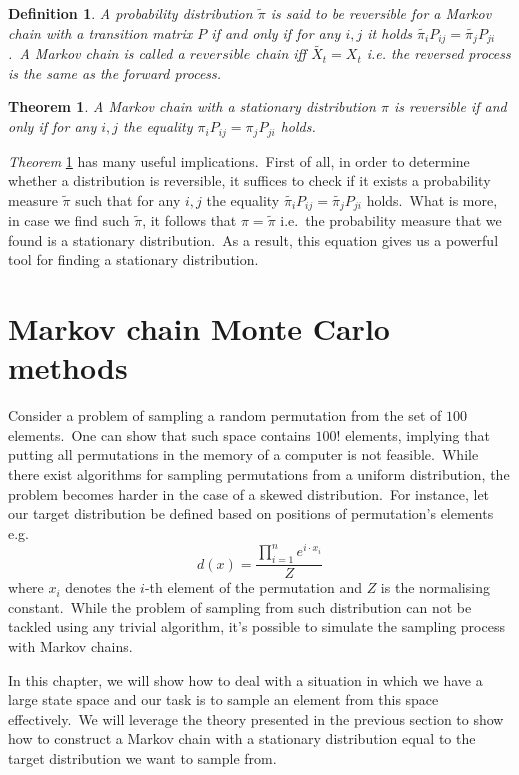 \documentclass[a4paper, 11pt, onecolumn, openany, titlepage]{report}
\newcommand\numberedchapter[1]{\setlength\topskip{3cm}\chapter{#1}\setlength\topskip{0cm}}
\theoremstyle{default_theorem_style}\newtheorem{theorem}{Theorem}
\theoremstyle{default_theorem_style}\newtheorem{definition}{Definition}
\begin{document}
\begin{definition}
A probability distribution $\tilde{\pi}$ is said to be \textit{reversible} for a Markov chain with a transition
matrix $P$ if and only if for any $i,j$ it holds $\tilde{\pi_i} P_{ij} = \tilde{\pi_j} P_{ji}$.\ A Markov chain
is called a $reversible$ chain iff $\tilde{X_t} = X_t$ i.e. the reversed process is the same as the forward process.
\end{definition}

\begin{theorem}\label{reversible_chain}
A Markov chain with a stationary distribution $\pi$ is reversible if and only if for any $i, j$ the equality
$\pi_i P_{ij} = \pi_j P_{ji}$ holds.
\end{theorem}

\textit{Theorem} \ref{reversible_chain} has many useful implications.\ First of all, in order to determine whether
a distribution is reversible, it suffices to check if it exists a probability measure $\tilde{\pi}$ such that
for any $i, j$ the equality $\tilde{\pi_i} P_{ij} = \tilde{\pi_j} P_{ji}$ holds.\ What is more, in case we find such
$\tilde{\pi}$, it follows that $\pi = \tilde{\pi}$ i.e.\ the probability measure that we found is a stationary
distribution.\ As a result, this equation gives us a powerful tool for finding a stationary distribution.

\numberedchapter{Markov chain Monte Carlo methods}\label{chapter:mcmc}

Consider a problem of sampling a random permutation from the set of $100$ elements.\ One can show that such space
contains $100!$ elements, implying that putting all permutations in the memory of a computer is not feasible.\ While
there exist algorithms for sampling permutations from a uniform distribution, the problem becomes harder in the case of
a skewed distribution.\ For instance, let our target distribution be defined based on positions of permutation's
elements e.g.
$$
d(x) = \frac{\prod_{i = 1}^{n} e^{i \cdot x_i}}{Z}
$$
where $x_i$ denotes the $i$-th element of the permutation and $Z$ is the normalising constant.\ While the problem
of sampling from such distribution can not be tackled using any trivial algorithm, it's possible to simulate the
sampling process with Markov chains.\newline

In this chapter, we will show how to deal with a situation in which we have a large state space and our task is to
sample an element from this space effectively.\ We will leverage the theory presented in the previous section to
show how to construct a Markov chain with a stationary distribution equal to the target distribution we want to
sample from.
\end{document}
